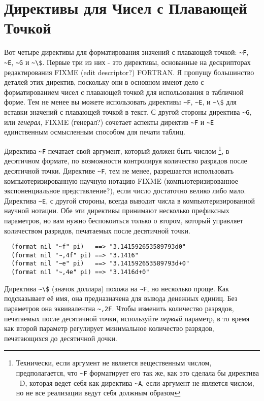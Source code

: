 {\section{Директивы для Чисел с Плавающей Точкой}

Вот четыре директивы для форматирования значений с плавающей точкой: \lstinline!~F!,
\lstinline!~E!, \lstinline!~G! и \lstinline!~\$!. Первые три из них - это директивы,
основанные на дескрипторах редактирования FIXME (edit descriptor?) FORTRAN. Я пропущу
большинство деталей этих директив, поскольку они в основном имеют дело с форматированием
чисел с плавающей точкой для использования в табличной форме. Тем не менее вы можете
использовать директивы \lstinline!~F!, \lstinline!~E!, и \lstinline!~\$! для вставки
значений с плавающей точкой в текст.  С другой стороны директива \lstinline!~G!, или
\textit{генерал}, FIXME (генерал?)  сочетает аспекты директив \lstinline!~F! и
\lstinline!~E! единственным осмысленным способом для печати таблиц.

Директива \lstinline!~F! печатает свой аргумент, который должен быть числом
\footnote{Технически, если аргумент не является вещественным числом, предполагается, что
  \lstinline!~F! форматирует его так же, как это сделала бы директива ~D, которая ведет
  себя как директива \lstinline!~A!, если аргумент не является числом, но не все
  реализации ведут себя должным образом}, в десятичном формате, по возможности контролируя
количество разрядов после десятичной точки. Директиве \lstinline!~F!, тем не менее,
разрешается использовать компьютеризированную научную нотацию FIXME (компьютеризированное
экспоненциальное представление?), если число достаточно велико либо мало. Директива
\lstinline!~E!, с другой стороны, всегда выводит числа в компьютеризированной научной
нотации. Обе эти директивы принимают несколько префиксных параметров, но вам нужно
беспокоиться только о втором, который управляет количеством разрядов, печатаемых после
десятичной точки.

\begin{verbatim}
  (format nil "~f" pi)   ==> "3.141592653589793d0"
  (format nil "~,4f" pi) ==> "3.1416"
  (format nil "~e" pi)   ==> "3.141592653589793d+0"
  (format nil "~,4e" pi) ==> "3.1416d+0"
\end{verbatim}

Директива \lstinline!~\$! (значок доллара) похожа на \lstinline!~F!, но несколько
проще. Как подсказывает её имя, она предназначена для вывода денежных единиц. Без
параметров она эквивалентна \lstinline!~,2F!. Чтобы изменить количество разрядов,
печатаемых после десятичной точки, используйте \textit{первый} параметр, в то время как
второй параметр регулирует минимальное количество разрядов, печатающихся до десятичной
дочки.

}
